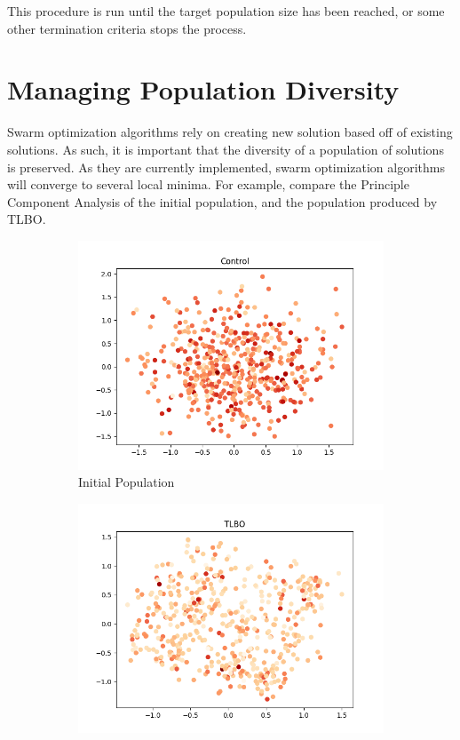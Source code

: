 \documentclass[11pt, letterpaper, onecolumn]{article}
\begin{document}
This procedure is run until the target population size has been reached, or some other termination criteria stops the process. 

\section{Managing Population Diversity}

Swarm optimization algorithms rely on creating new solution based off of existing solutions. As such, it is important that the diversity of a population of solutions is preserved. As they are currently implemented, swarm optimization algorithms will converge to several local minima. For example, compare the Principle Component Analysis of the initial population, and the population produced by TLBO. 

\begin{figure}[h!]
  \centering
  \begin{subfigure}[b]{0.4\linewidth}
    \includegraphics[width=\linewidth]{graphs/Control__pca.png}
    \caption{Initial Population}
  \end{subfigure}
  \begin{subfigure}[b]{0.4\linewidth}
    \includegraphics[width=\linewidth]{graphs/TLBO__pca.png}

\end{subfigure}
\end{figure}
\end{document}

